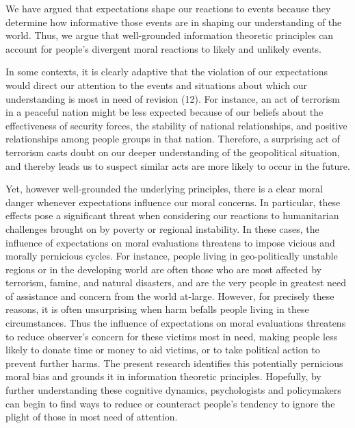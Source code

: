 \documentclass[9pt,twocolumn,twoside,]{pnas-new}
\begin{document}
We have argued that expectations shape our reactions to events because
they determine how informative those events are in shaping our
understanding of the world. Thus, we argue that well-grounded
information theoretic principles can account for people's divergent
moral reactions to likely and unlikely events.

In some contexts, it is clearly adaptive that the violation of our
expectations would direct our attention to the events and situations
about which our understanding is most in need of revision (12). For
instance, an act of terrorism in a peaceful nation might be less
expected because of our beliefs about the effectiveness of security
forces, the stability of national relationships, and positive
relationships among people groups in that nation. Therefore, a
surprising act of terrorism casts doubt on our deeper understanding of
the geopolitical situation, and thereby leads us to suspect similar acts
are more likely to occur in the future.

Yet, however well-grounded the underlying principles, there is a clear
moral danger whenever expectations influence our moral concerns. In
particular, these effects pose a significant threat when considering our
reactions to humanitarian challenges brought on by poverty or regional
instability. In these cases, the influence of expectations on moral
evaluations threatens to impose vicious and morally pernicious cycles.
For instance, people living in geo-politically unstable regions or in
the developing world are often those who are most affected by terrorism,
famine, and natural disasters, and are the very people in greatest need
of assistance and concern from the world at-large. However, for
precisely these reasons, it is often unsurprising when harm befalls
people living in these circumstances. Thus the influence of expectations
on moral evaluations threatens to reduce observer's concern for these
victims most in need, making people less likely to donate time or money
to aid victims, or to take political action to prevent further harms.
The present research identifies this potentially pernicious moral bias
and grounds it in information theoretic principles. Hopefully, by
further understanding these cognitive dynamics, psychologists and
policymakers can begin to find ways to reduce or counteract people's
tendency to ignore the plight of those in most need of attention.
\end{document}
